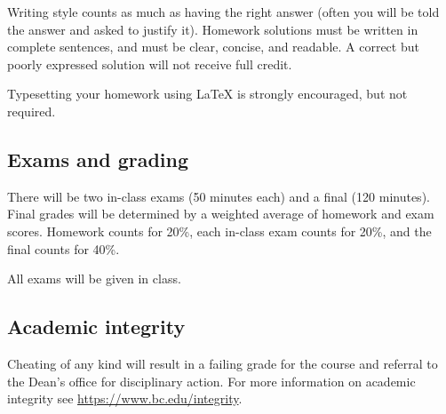 \documentclass[11pt,oneside]{amsart}
\begin{document}
Writing style counts as much as having the right answer (often you will be told the answer and asked to justify it). Homework solutions must be written in complete sentences, and must be clear, concise, and readable. A correct but poorly expressed solution will not receive full credit.

Typesetting your homework using LaTeX is strongly encouraged, but not required.

\subsection*{Exams and grading}
There will be two in-class exams (50 minutes each) and a final (120 minutes). Final grades will be determined by a weighted average of homework and exam scores.  Homework counts for 20\%, each in-class exam counts for 20\%, and the final counts for 40\%.

All exams will be given in class.

\subsection*{Academic integrity}
Cheating of any kind will result in a failing grade for the course and referral to the Dean’s office for disciplinary action.  For more information on academic integrity see \url{https://www.bc.edu/integrity}.
\end{document}
